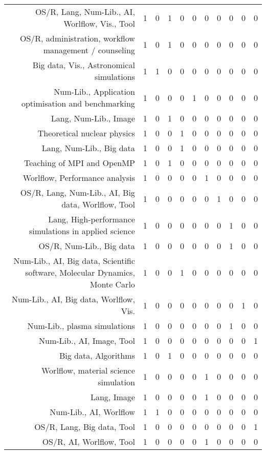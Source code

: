 {\begin{landscape}
\begin{longtable}[htb]{r|c|c|c|c|c|c|c|c|c|c}
{OS/R, Lang, Num-Lib., AI, Worlflow, Vis., Tool} & 1 & 0 & 1 & 0 & 0 & 0 & 0 & 0 & 0 & 0 \\%
{OS/R, administration, workflow management / counseling} & 1 & 0 & 1 & 0 & 0 & 0 & 0 & 0 & 0 & 0 \\%
{Big data, Vis., Astronomical simulations} & 1 & 1 & 0 & 0 & 0 & 0 & 0 & 0 & 0 & 0 \\%
{Num-Lib., Application optimisation and benchmarking} & 1 & 0 & 0 & 0 & 1 & 0 & 0 & 0 & 0 & 0 \\%
{Lang, Num-Lib., Image} & 1 & 0 & 1 & 0 & 0 & 0 & 0 & 0 & 0 & 0 \\%
{Theoretical nuclear physics} & 1 & 0 & 0 & 1 & 0 & 0 & 0 & 0 & 0 & 0 \\%
{Lang, Num-Lib., Big data} & 1 & 0 & 0 & 1 & 0 & 0 & 0 & 0 & 0 & 0 \\%
{Teaching of MPI and OpenMP} & 1 & 0 & 1 & 0 & 0 & 0 & 0 & 0 & 0 & 0 \\%
{Worlflow, Performance analysis} & 1 & 0 & 0 & 0 & 0 & 1 & 0 & 0 & 0 & 0 \\%
{OS/R, Lang, Num-Lib., AI, Big data, Worlflow, Tool} & 1 & 0 & 0 & 0 & 0 & 0 & 1 & 0 & 0 & 0 \\%
{Lang, High-performance simulations in applied science} & 1 & 0 & 0 & 0 & 0 & 0 & 0 & 1 & 0 & 0 \\%
{OS/R, Num-Lib., Big data} & 1 & 0 & 0 & 0 & 0 & 0 & 0 & 1 & 0 & 0 \\%
{Num-Lib., AI, Big data, Scientific software, Molecular Dynamics, Monte Carlo} & 1 & 0 & 0 & 1 & 0 & 0 & 0 & 0 & 0 & 0 \\%
{Num-Lib., AI, Big data, Worlflow, Vis.} & 1 & 0 & 0 & 0 & 0 & 0 & 0 & 0 & 1 & 0 \\%
{Num-Lib., plasma simulations} & 1 & 0 & 0 & 0 & 0 & 0 & 0 & 1 & 0 & 0 \\%
{Num-Lib., AI, Image, Tool} & 1 & 0 & 0 & 0 & 0 & 0 & 0 & 0 & 0 & 1 \\%
{Big data, Algorithms} & 1 & 0 & 1 & 0 & 0 & 0 & 0 & 0 & 0 & 0 \\%
{Worlflow, material science simulation} & 1 & 0 & 0 & 0 & 0 & 1 & 0 & 0 & 0 & 0 \\%
{Lang, Image} & 1 & 0 & 0 & 0 & 0 & 1 & 0 & 0 & 0 & 0 \\%
{Num-Lib., AI, Worlflow} & 1 & 1 & 0 & 0 & 0 & 0 & 0 & 0 & 0 & 0 \\%
{OS/R, Lang, Big data, Tool} & 1 & 0 & 0 & 0 & 0 & 0 & 0 & 0 & 0 & 1 \\%
{OS/R, AI, Worlflow, Tool} & 1 & 0 & 0 & 0 & 0 & 1 & 0 & 0 & 0 & 0 \\%

\end{longtable}
\end{landscape}}
